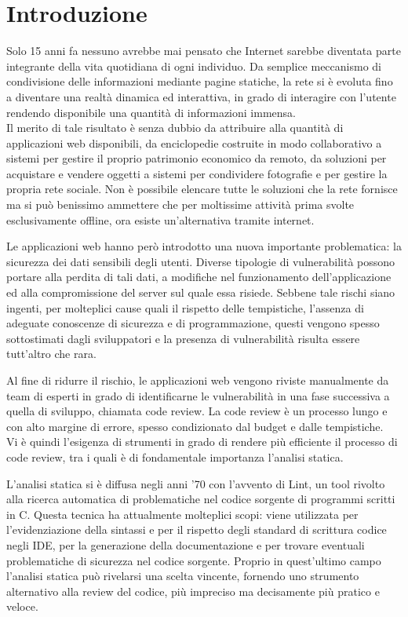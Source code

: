 \chapter{Introduzione}
Solo 15 anni fa nessuno avrebbe mai pensato che Internet sarebbe diventata parte integrante della vita quotidiana di ogni individuo. Da semplice meccanismo di condivisione delle informazioni mediante pagine statiche, la rete si è evoluta fino a diventare una realtà dinamica ed interattiva, in grado di interagire con l'utente rendendo disponibile una quantità di informazioni immensa.\\
Il merito di tale risultato è senza dubbio da attribuire alla quantità di applicazioni web disponibili, da enciclopedie costruite in modo collaborativo a sistemi per gestire il proprio patrimonio economico da remoto, da soluzioni per acquistare e vendere oggetti a sistemi per condividere fotografie e per gestire la propria rete sociale. Non è possibile elencare tutte le soluzioni che la rete fornisce ma si può benissimo ammettere che per moltissime attività prima svolte esclusivamente offline, ora esiste un'alternativa tramite internet.

Le applicazioni web hanno però introdotto una nuova importante problematica: la sicurezza dei dati sensibili degli utenti. Diverse tipologie di vulnerabilità possono portare alla perdita di tali dati, a modifiche nel funzionamento dell'applicazione ed alla compromissione del server sul quale essa risiede. Sebbene tale rischi siano ingenti, per molteplici cause quali il rispetto delle tempistiche, l'assenza di adeguate conoscenze di sicurezza e di programmazione, questi vengono spesso sottostimati dagli sviluppatori e la presenza di vulnerabilità risulta essere tutt'altro che rara.

Al fine di ridurre il rischio, le applicazioni web vengono riviste manualmente da team di esperti in grado di identificarne le vulnerabilità in una fase successiva a quella di sviluppo, chiamata code review. La code review è un processo lungo e con alto margine di errore, spesso condizionato dal budget e dalle tempistiche.\\
Vi è quindi l'esigenza di strumenti in grado di rendere più efficiente il processo di code review, tra i quali è di fondamentale importanza l'analisi statica. 

L'analisi statica si è diffusa negli anni '70 con l'avvento di Lint, un tool rivolto alla ricerca automatica di problematiche nel codice sorgente di programmi scritti in C. Questa tecnica ha attualmente molteplici scopi: viene utilizzata per l'evidenziazione della sintassi e per il rispetto degli standard di scrittura codice negli IDE, per la generazione della documentazione e per trovare eventuali problematiche di sicurezza nel codice sorgente.
Proprio in quest'ultimo campo l'analisi statica può rivelarsi una scelta vincente, fornendo uno strumento alternativo alla review del codice, più impreciso ma decisamente più pratico e veloce. 

